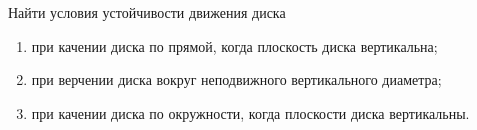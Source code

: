 Найти условия устойчивости движения диска
\begin{enumerate}
\item при качении диска по прямой, когда плоскость диска вертикальна;
\item при верчении диска вокруг неподвижного вертикального диаметра;
\item при качении диска по окружности, когда плоскости диска вертикальны.
\end{enumerate}
